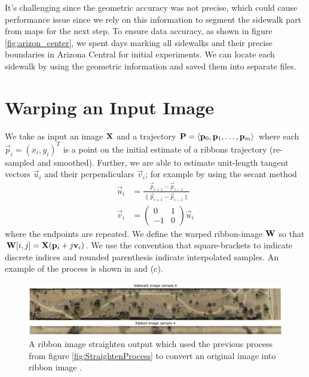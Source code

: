 It's challenging since the geometric accuracy was not precise,
 which could cause performance issue since we rely on this 
 information to segment the sidewalk part from maps for the next step. 
To ensure data accuracy, as shown in figure \ref{fig:arizon_center},
 we spent days marking all sidewalks and their precise boundaries 
 in Arizona Central for initial experiments. 
We can locate each sidewalk by using the geometric information 
and saved them into separate files. 

\section{Warping an Input Image}

We take as input an image $\mathbf{X}{}$ and a trajectory $\mathbf{P}{}=\langle \mathbf{p}_0,
\mathbf{p}_1,\dots,\mathbf{p}_m\rangle$ where each $\vec{p}_i=(x_i, y_i)^T$ is a point on the initial
estimate of a ribbons trajectory (re-sampled and smoothed). Further, we are able to estimate
unit-length tangent vectors $\vec{u}_i$ and their perpendiculars $\vec{v}_i$; for example by using
the secant method
\begin{align}
  \vec{u}_i &= \frac{\vec{p}_{i+1}-\vec{p}_{i-1}}{\|\vec{p}_{i+1}-\vec{p}_{i-1}\|} \\
  \vec{v}_i &= \left(\begin{array}{cc}
       0  & 1 \\
       -1 & 0
  \end{array} \right) \vec{u}_i
\end{align}
where the endpoints are repeated. 
We define the warped ribbon-image $\mathbf{W}{}$ so that $\mathbf{W}{[i,j]}=\mathbf{X}{}(\mathbf{p}_i+ j \mathbf{v}_i)$. 
We use the convention that square-brackets to indicate discrete indices and rounded parenthesis indicate interpolated samples. 
An example of the process is shown in  and (c). 

\begin{figure}[H]
    \centering
    \includegraphics[width=\textwidth]{Figures/Sample4_needed.png}
    \caption[Sample Sidewalk 1]{A ribbon image straighten output which used the previous process from figure \ref{fig:StraightenProcess} to convert an original image into ribbon image .}
    \label{fig:Sample_Sidewalk_4}
\end{figure}

